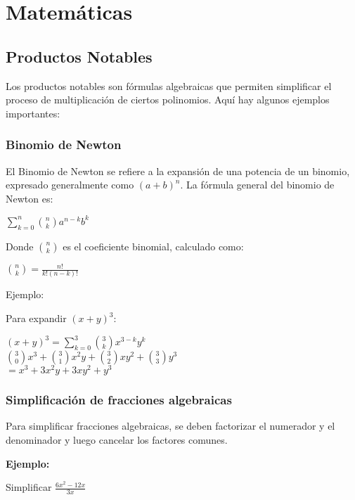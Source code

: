 \section{Matemáticas}

\subsection{Productos Notables}

Los productos notables son fórmulas algebraicas que permiten simplificar el proceso de multiplicación de ciertos polinomios. Aquí hay algunos ejemplos importantes:

\subsubsection{Binomio de Newton}

El Binomio de Newton se refiere a la expansión de una potencia de un binomio, expresado generalmente como $(a+b)^n$. La fórmula general del binomio de Newton es:

\begin{center}
    $\sum_{k=0}^n \binom{n}{k} a^{n - k} b^k$
\end{center}

Donde $\binom{n}{k}$ es el coeficiente binomial, calculado como:

\begin{center}
    $\binom{n}{k} = \frac{n!}{k!(n-k)!}$
\end{center}

Ejemplo:

Para expandir $(x + y)^3$:

\begin{center}
    $(x + y)^3 = \sum_{k=0}^3 \binom{3}{k}x^{3-k}y^k$\\
    $\binom{3}{0}x^3 + \binom{3}{1}x^2y + \binom{3}{2}xy^2 + \binom{3}{3}y^3$\\
    $= x^3 + 3x^2y + 3xy^2 + y^3$
\end{center}


\subsubsection{Simplificación de fracciones algebraicas}
Para simplificar fracciones algebraicas, se deben factorizar el numerador y el denominador y luego cancelar los factores comunes.

\textbf{Ejemplo:}

Simplificar $\frac{6x^2-12x}{3x}$

